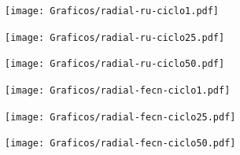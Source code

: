 	\pagebreak
	\begin{figure}[t!]
			   	    \begin{subfigure}[t]{0.325\textwidth}
			        	\texttt{[image: Graficos/radial-ru-ciclo1.pdf]}
			     		\end{subfigure}
			   	    \begin{subfigure}[t]{0.325\textwidth}
			        	\texttt{[image: Graficos/radial-ru-ciclo25.pdf]}
			     		\end{subfigure}
		     		\begin{subfigure}[t]{0.325\textwidth}
			        	\texttt{[image: Graficos/radial-ru-ciclo50.pdf]}
			     		\end{subfigure}
		     		\begin{subfigure}[t]{0.325\textwidth}
			        	\texttt{[image: Graficos/radial-fecn-ciclo1.pdf]}
			     		\end{subfigure}
		 	   	   	\begin{subfigure}[t]{0.325\textwidth}
			        	\texttt{[image: Graficos/radial-fecn-ciclo25.pdf]}
			     		\end{subfigure}
		     		\begin{subfigure}[t]{0.325\textwidth}
			        	\texttt{[image: Graficos/radial-fecn-ciclo50.pdf]}
			     		\end{subfigure}
			     	\begin{subfigure}[t]{0.325\textwidth}

\end{subfigure}
\end{figure}
